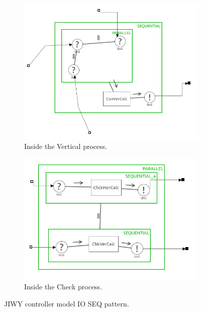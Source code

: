 \documentclass[a4paper,twoside,11pt]{article}
\begin{document}
\begin{figure}
	\begin{subfigure}{0.6\textwidth}
		\centering
		\includegraphics[width=\textwidth]{./images/4-3_ver.png}
		\caption{Inside the Vertical process.}
		\label{sub:4_3_vert}
	\end{subfigure}
	\begin{subfigure}{0.6\textwidth}
		\centering
		\includegraphics[width=\textwidth]{./images/4-3_check.png}
		\caption{Inside the Check process.}
		\label{sub:4_3_check}
	\end{subfigure}
	\caption{JIWY controller model IO SEQ pattern.}
	\label{fig:4_3_model}
\end{figure}
\end{document}
